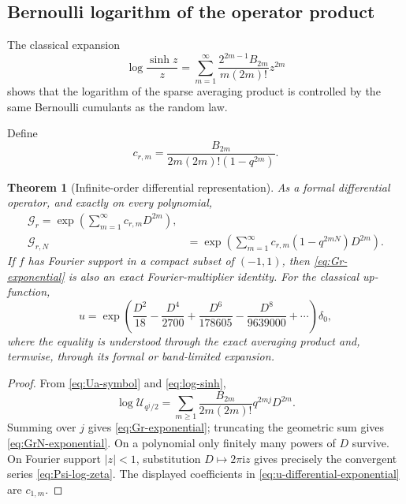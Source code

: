 \documentclass[11pt,oneside]{article}
\numberwithin{equation}{section}
\newtheorem{theorem}{Theorem}[section]
\theoremstyle{definition}
\theoremstyle{remark}
\newcommand{\ii}{\mathrm i}
\newcommand{\cU}{\mathcal U}
\newcommand{\cG}{\mathcal G}
\begin{document}
\subsection{Bernoulli logarithm of the operator product}

The classical expansion
\begin{equation}
 \log\frac{\sinh z}{z}
 =\sum_{m=1}^{\infty}
   \frac{2^{2m-1}B_{2m}}{m(2m)!}z^{2m}                   \label{eq:log-sinh}
\end{equation}
shows that the logarithm of the sparse averaging product is controlled by the
same Bernoulli cumulants as the random law.

Define
\begin{equation}
 c_{r,m}=\frac{B_{2m}}{2m(2m)!(1-q^{2m})}.                 \label{eq:crm}
\end{equation}

\begin{theorem}[Infinite-order differential representation]
\label{thm:infinite-differential-operator}
As a formal differential operator, and exactly on every polynomial,
\begin{align}
 \boxed{\displaystyle
 \cG_r
 =\exp\!\left(\sum_{m=1}^{\infty}c_{r,m}D^{2m}\right),}  \label{eq:Gr-exponential}\\
 \cG_{r,N}
 &=\exp\!\left(\sum_{m=1}^{\infty}
       c_{r,m}(1-q^{2mN})D^{2m}\right).                   \label{eq:GrN-exponential}
\end{align}
If $f$ has Fourier support in a compact subset of $(-1,1)$, then
\eqref{eq:Gr-exponential} is also an exact Fourier-multiplier identity.
For the classical up-function,
\begin{equation}
 \boxed{\displaystyle
 u=\exp\!\left(
   \frac{D^2}{18}-\frac{D^4}{2700}+\frac{D^6}{178605}
   -\frac{D^8}{9639000}+\cdots\right)\delta_0,}           \label{eq:u-differential-exponential}
\end{equation}
where the equality is understood through the exact averaging product and,
termwise, through its formal or band-limited expansion.
\end{theorem}

\begin{proof}
From \eqref{eq:Ua-symbol} and \eqref{eq:log-sinh},
\[
 \log\cU_{q^j/2}
 =\sum_{m\ge1}\frac{B_{2m}}{2m(2m)!}q^{2mj}D^{2m}.
\]
Summing over $j$ gives \eqref{eq:Gr-exponential}; truncating the geometric sum
gives \eqref{eq:GrN-exponential}.  On a polynomial only finitely many
powers of $D$ survive.  On Fourier support $|z|<1$, substitution
$D\mapsto2\pi\ii z$ gives precisely the convergent series
\eqref{eq:Psi-log-zeta}.  The displayed coefficients in
\eqref{eq:u-differential-exponential} are $c_{1,m}$.
\end{proof}
\end{document}
